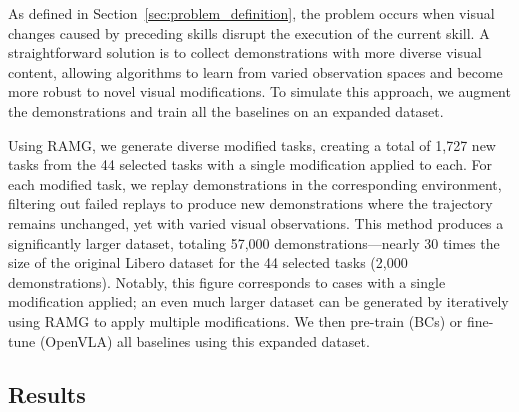 As defined in Section~\ref{sec:problem_definition}, the \pb problem occurs when visual changes caused by preceding skills disrupt the execution of the current skill. A straightforward solution is to collect demonstrations with more diverse visual content, allowing algorithms to learn from varied observation spaces and become more robust to novel visual modifications. To simulate this approach, we augment the demonstrations and train all the baselines on an expanded dataset.

Using RAMG, we generate diverse modified tasks, creating a total of 1,727 new tasks from the 44 selected tasks with a single modification applied to each. For each modified task, we replay demonstrations in the corresponding environment, filtering out failed replays to produce new demonstrations where the trajectory remains unchanged, yet with varied visual observations. This method produces a significantly larger dataset, totaling 57,000 demonstrations—nearly 30 times the size of the original Libero dataset for the 44 selected tasks (2,000 demonstrations). Notably, this figure corresponds to cases with a single modification applied; an even much larger dataset can be generated by iteratively using RAMG to apply multiple modifications. We then pre-train (BCs) or fine-tune (OpenVLA) all baselines using this expanded dataset.






\subsection{Results}
\label{subsec:results_bl}



